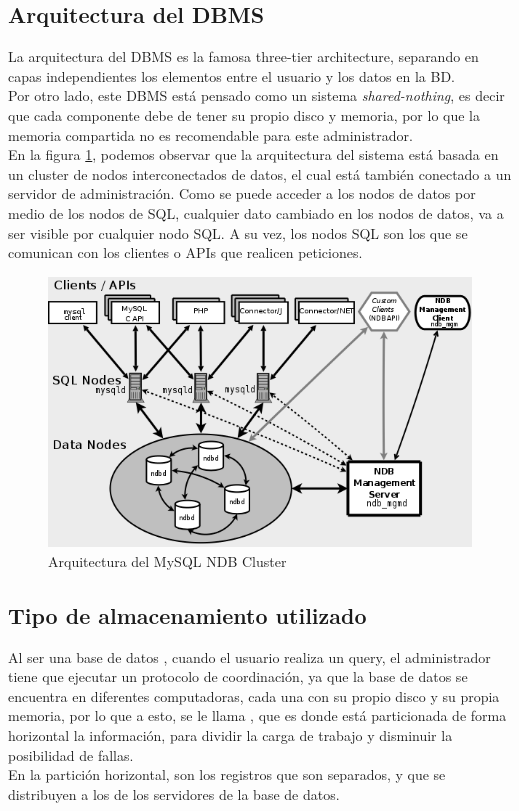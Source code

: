 \documentclass{acmart}
\begin{document}
\subsection{Arquitectura del DBMS}
La arquitectura del DBMS es la famosa three-tier architecture, separando en capas independientes los elementos entre el usuario y los datos en la BD.\\
Por otro lado, este DBMS está pensado como un sistema \textit{shared-nothing}, es decir que cada componente debe de tener su propio disco y memoria, por lo que la memoria compartida no es recomendable para este administrador.\\
En la figura \ref{mysqlarch}, podemos observar que la arquitectura del sistema está basada en un cluster de nodos interconectados de datos, el cual está también conectado a un servidor de administración. Como se puede acceder a los nodos de datos por medio de los nodos de SQL, cualquier dato cambiado en los nodos de datos, va a ser visible por cualquier nodo SQL. A su vez, los nodos SQL son los que se comunican con los clientes o APIs que realicen peticiones.
\begin{figure}
    \centering
    \includegraphics[width=0.6\linewidth]{mysqlndbarch.png}
    \caption{Arquitectura del MySQL NDB Cluster}
    \label{mysqlarch}
\end{figure}

\subsection{Tipo de almacenamiento utilizado}
Al ser una base de datos , cuando el usuario realiza un query, el administrador tiene que ejecutar un protocolo de coordinación, ya que la base de datos se encuentra en diferentes computadoras, cada una con su propio disco y su propia memoria, por lo que a esto, se le llama , que es donde está particionada de forma horizontal la información, para dividir la carga de trabajo y disminuir la posibilidad de fallas.\\
En la partición horizontal, son los registros que son separados, y que se distribuyen a los  de los servidores de la base de datos.
\end{document}
